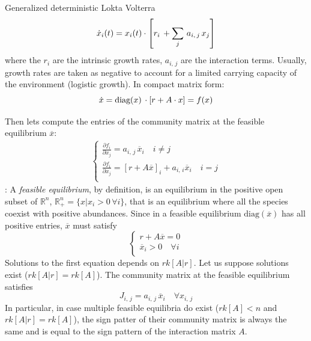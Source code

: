Generalized deterministic Lokta Volterra
\begin{equation}
    \centering
     \dot{x}_i(t) = x_i(t)\cdot \left[ r_i\, + \sum_j\, a_{i,\,j}\, x_j \right] \label{eq:gLV}
\end{equation}
where the $r_i$ are the intrinsic growth rates, $a_{i,\,j }$ are the interaction terms. Usually, growth rates are taken as negative to account for a limited carrying capacity of the environment (logistic growth).
In compact matrix form:
\begin{equation}
    \centering
    \dot{x} = \text{diag}(x)\,\cdot \left[r + A\cdot x\right] = f(x)
\end{equation}

Then lets compute the entries of the community matrix at the feasible equilibrium $\overline{x}$:
\begin{align}
    \begin{cases}
    \frac{\partial f_i}{\partial x_j} = a_{i,\,j}\, \overline{x}_i \quad i\neq j \\
    \frac{\partial f_i}{\partial x_j} = [r + A\overline{x}]_i+ a_{i,\,i}\overline{x}_i \quad i= j \\
    \end{cases}
\end{align}:
A \textit{feasible equilibrium}, by definition, is an equilibrium in the positive open subset of $\mathbb{R}^n$, $\mathbb{R}^n_{+} = \{x | x_i > 0\, \forall i\}$, that is an equilibrium where all the species coexist with positive abundances. Since in a feasible equilibrium $\text{diag}(\overline{x})$ has all positive entries, $\overline{x}$ must satisfy
\begin{equation}
\begin{cases}
r + A \overline{x} = 0 \\
\overline{x}_i > 0\quad \forall i \\
\end{cases}
\end{equation}
Solutions to the first equation depends on $rk[A|r]$.  Let us suppose solutions exist ($rk[A|r] = rk[A]$). The community matrix at the feasible equilibrium satisfies
\begin{equation}
    J_{i,\,j} = a_{i,\,j}\,\overline{x}_i \quad \forall x_{i,\,j}
\end{equation}
In particular, in case multiple feasible equilibria do exist ($rk[A]< n$ and $rk[A|r] = rk[A]$), the sign patter of their community matrix is always the same and is equal to the sign pattern of the interaction matrix $A$.

